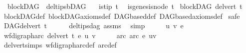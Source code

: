 \begin{isabellebody}
%
\endisatagproof
{\isafoldproof}%
%
\isadelimproof
\isanewline
%
\endisadelimproof
\isanewline
{}\isamarkupfalse%
\ {\isacharparenleft}{\kern0pt}\ blockDAG{\isacharparenright}{\kern0pt}\ \ del{\isacharunderscore}{\kern0pt}tips{\isacharunderscore}{\kern0pt}bDAG{\isacharcolon}{\kern0pt}\isanewline
\ \ \ {\isachardoublequoteopen}is{\isacharunderscore}{\kern0pt}tip\ t{\isachardoublequoteclose}\isanewline
{}\ {\isachardoublequoteopen}\ {\isasymnot}is{\isacharunderscore}{\kern0pt}genesis{\isacharunderscore}{\kern0pt}node\ t{\isachardoublequoteclose}\isanewline
{}\ {\isachardoublequoteopen}blockDAG\ {\isacharparenleft}{\kern0pt}del{\isacharunderscore}{\kern0pt}vert\ t{\isacharparenright}{\kern0pt}{\isachardoublequoteclose}\isanewline
%
\isadelimproof
\ \ %
\endisadelimproof
%
\isatagproof
{}\isamarkupfalse%
\ blockDAG{\isacharunderscore}{\kern0pt}def\ blockDAG{\isacharunderscore}{\kern0pt}axioms{\isacharunderscore}{\kern0pt}def\ DAGbased{\isacharunderscore}{\kern0pt}def\ DAGbased{\isacharunderscore}{\kern0pt}axioms{\isacharunderscore}{\kern0pt}def\isanewline
{}\isamarkupfalse%
\ safe\isanewline
\ \ \isamarkupfalse%
\ {\isachardoublequoteopen}DAG{\isacharparenleft}{\kern0pt}del{\isacharunderscore}{\kern0pt}vert\ t{\isacharparenright}{\kern0pt}{\isachardoublequoteclose}\isanewline
\ \ \ \ \isamarkupfalse%
\ del{\isacharunderscore}{\kern0pt}tips{\isacharunderscore}{\kern0pt}dag\ assms\ \isamarkupfalse%
\ simp\isanewline
{}\isamarkupfalse%
\ \isanewline
\ \ \isamarkupfalse%
\ u\ v\ e\ \isanewline
\ \ \isamarkupfalse%
\ {\isachardoublequoteopen}wf{\isacharunderscore}{\kern0pt}digraph{\isachardot}{\kern0pt}arc\ {\isacharparenleft}{\kern0pt}del{\isacharunderscore}{\kern0pt}vert\ t{\isacharparenright}{\kern0pt}\ e\ {\isacharparenleft}{\kern0pt}u{\isacharcomma}{\kern0pt}\ v{\isacharparenright}{\kern0pt}{\isachardoublequoteclose}\isanewline
\ \ \isamarkupfalse%
\ \isamarkupfalse%
\ arc{\isacharcolon}{\kern0pt}\ {\isachardoublequoteopen}arc\ e\ {\isacharparenleft}{\kern0pt}u{\isacharcomma}{\kern0pt}v{\isacharparenright}{\kern0pt}{\isachardoublequoteclose}\ \isamarkupfalse%
\ del{\isacharunderscore}{\kern0pt}vert{\isacharunderscore}{\kern0pt}simps\ wf{\isacharunderscore}{\kern0pt}digraph{\isachardot}{\kern0pt}arc{\isacharunderscore}{\kern0pt}def\ arc{\isacharunderscore}{\kern0pt}def\isanewline
\ \ \ \ \isamarkupfalse%

\end{isabellebody}

